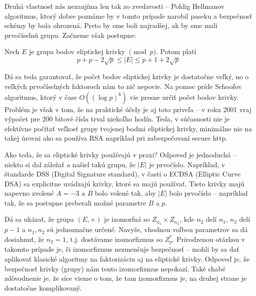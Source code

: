 Druhá vlastnosť nás nezaujíma len tak zo zvedavosti -- Pohlig Hellmanov
algoritmus, ktorý dobre poznáme by v tomto prípade narobil paseku a
bezpečnosť schémy by bola ohrozená. Preto by sme boli najradšej, ak by
sme mali prvočíselnú grupu. Začneme však postupne:

\begin{veta}
    Nech $E$ je grupa bodov eliptickej krivky $\pmod{p}$.
    Potom platí
    \begin{equation*}
        p+p - 2 \sqrt{p} \le |E| \le p + 1 + 2 \sqrt{p}
    \end{equation*}
\end{veta}

Dá sa teda garantovať, že počet bodov eliptickej krivky je dostatočne
veľký, no o veľkých prvočíselných faktoroch nám to nič nepovie.
Na pomoc príde Schoofov algoritmus, ktorý v čase
$O((\log{p})^6)$ vie presne určiť počet bodov krivky. Problém je však
v tom, že na praktické účely je aj toto priveľa -- v roku 2001 vraj
výpočet pre 200 bitové čísla trval niekoľho hodín. Teda, v súčasnosti
nie je efektívne počítať veľkosť grupy tvojenej bodmi eliptickej
krivky, minimálne nie na takej úrovni ako sa používa RSA napríklad pri
zabezpečovaní secure http.

Ako teda, že sa eliptické krivky používajú v praxi? Odpoveď je
jednoduchá -- niekto si dal záležať a našiel takú grupu, že $|E|$ je
prvočíslo. Napríklad, v štandarde DSS (Digital Signature standard), v
časti o ECDSA (Elliptic Curve DSA) sa explicitne uvádzajú krivky,
ktoré sa majú používať. Tieto krivky majú napevno zvolené $A=-3$ a $B$
bolo volené tak, aby $|E|$ bolo prvočíslo -- napríklad tak, že sa
postupne preberali možné parametre $B$ a $p$.

\begin{poznamka}
    Dá sa ukázať, že grupa $(E,+)$ je izomorfná so
    $Z_{n_1} \times Z_{n_2}$, kde $n_2$ delí $n_1$, $n_2$ delí $p-1$ a
    $n_1,n_2$ sú jednoznačne určené.
    Navyše, vhodnou voľbou parametrov sa dá dosiahnuť, že
    $n_2=1$, t.j. dostávame izomorfizmus so $Z_p^*$. Prirodzenou
    otázkou v takomto prípade je, či izomorfizmus nezmenšuje
    bezpečnosť -- mohli by sa dať aplikovať klasické algoritmy na
    faktorizáciu aj na eliptické krivky.
    Odpoveď je, že bezpečnosť krivky (grupy) nám tento izomorfizmus
    nepokazí. Také chabé zdôvodnenie je, že síce vieme o tom, že tam
    izomorfizmus je, na druhej strane je dostatočne komplikovaný.
\end{poznamka}

